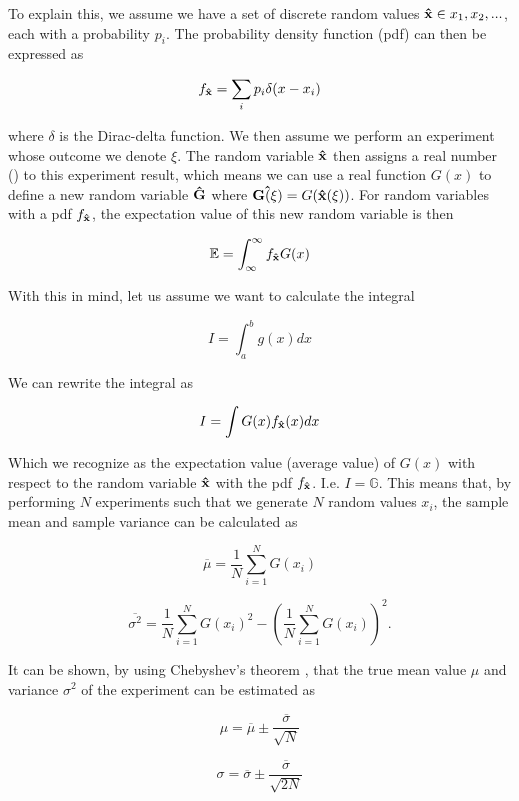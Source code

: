 \documentclass[a4paper,10pt,english]{article}
\begin{document}
To explain this, we assume we have a set of discrete random values $\bold{\hat{x}} \in {x_1,x_2, ...}$, each with a probability $p_i$. The probability density function (pdf) can then be expressed as 

$$f_\bold{\hat{x}} = \sum_i p_i \delta (x - x_i)$$

where $\delta$ is the Dirac-delta function. We then assume we perform an experiment whose outcome we denote $\xi$. The random variable $\bold{\hat{x}}$ then assigns a real number (\ksi) to this experiment result, which means we can use a real function $G(x)$ to define a new random variable $\bold{\hat{G}}$ where $\bold{\hat{G(\xi)}} = G(\bold{\hat{x}}(\xi))$. For random variables with a pdf $f_\bold{\hat{x}}$, the expectation value of this new random variable  is then

$$\mathbb{E} = \int_{\infty}^\infty f_\bold{\hat{x}}G(x)$$

With this in mind, let us assume we want to calculate the integral

$$I = \int_a^b g(x) dx$$

We can rewrite the integral as

$$I = \int G(x) f_\bold{\hat{x}}(x) dx$$

Which we recognize as the expectation value (average value) of $G(x)$ with respect to the random variable $\bold{\hat{x}}$ with the pdf $f_\bold{\hat{x}}$. I.e. $I = \mathbb{G}$. This means that, by performing $N$ experiments such that we generate $N$ random values $x_i$, the sample mean and sample variance can be calculated as

$$\overline{\mu} = \frac{1}{N} \sum_{i=1}^N G(x_i)$$

$$\overline{\sigma^2} = \frac{1}{N} \sum_{i = 1}^N G(x_i)^2 - \left( \frac{1}{N} \sum_{i = 1}^N G(x_i) \right)^2. $$

It can be shown, by using Chebyshev's theorem \cite{Toral+Colet}, that the true mean value $\mu$ and variance $\sigma^2$ of the experiment can be estimated as

\begin{equation} \label{eq:mu_samp}
    \mu = \overline{\mu} \pm \frac{\overline{\sigma}}{\sqrt{N}}
\end{equation}

\begin{equation}\label{eq:sigma_samp}
    \sigma = \overline{\sigma} \pm \frac{\overline{\sigma}}{\sqrt{2N}} 
\end{equation}
\end{document}
